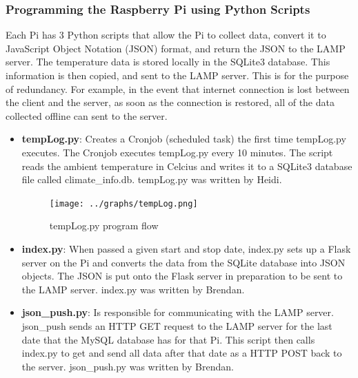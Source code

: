 \documentclass{article}
\begin{document}
			\subsubsection{Programming the Raspberry Pi using Python Scripts}
				Each Pi has 3 Python scripts that allow the Pi to collect data, convert it to JavaScript Object
				Notation (JSON) format, and return the JSON to the LAMP server. The temperature data is stored locally
				in the SQLite3 database. This information is then copied, and sent to the LAMP server. This is for the 
				purpose of redundancy. For example, in the event that internet connection is lost between the client and
				the server, as soon as the connection is restored, all of the data collected offline can sent to the server.

				\begin{itemize}
					\item {\bfseries tempLog.py}: Creates a Cronjob (scheduled task) the first time tempLog.py executes. The Cronjob 
									  executes tempLog.py every 10 minutes. The script reads the ambient temperature
									  in Celcius and writes it to a SQLite3 database file called climate\_info.db. tempLog.py was
									  written by Heidi.
						\begin{figure}[H]				
							\begin{center}
								\texttt{[image: ../graphs/tempLog.png]}\\
							\end{center}
							\captionsetup{labelformat=empty}
							\caption{tempLog.py program flow}
						\end{figure}
						
					\item {\bfseries index.py}: When passed a given start and stop date, index.py sets up a Flask server on the Pi and 
									converts the data from the SQLite database into JSON objects. The JSON is put onto the Flask server in
									preparation to be sent to the LAMP server. index.py was written by Brendan.
					\item {\bfseries json\_push.py}: Is responsible for communicating with the LAMP server. json\_push sends an HTTP GET request
													 to the LAMP server for the last date that the MySQL database has for that Pi. This script
													 then calls index.py to get and send all data after that date as a HTTP POST back to the server.
													 json\_push.py was written by Brendan.
				\end{itemize}
				
\end{document}
